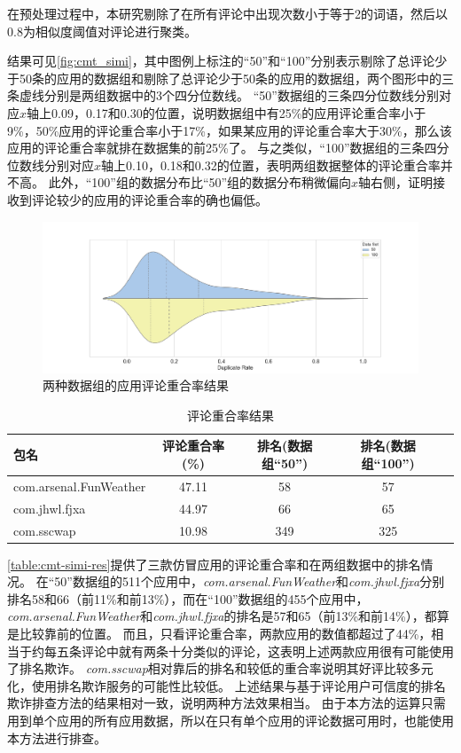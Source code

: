在预处理过程中，本研究剔除了在所有评论中出现次数小于等于2的词语，然后以0.8为相似度阈值对评论进行聚类。

结果可见\autoref{fig:cmt_simi}，其中图例上标注的``50''和``100''分别表示剔除了总评论少于50条的应用的数据组和剔除了总评论少于50条的应用的数据组，两个图形中的三条虚线分别是两组数据中的3个四分位数线。
``50''数据组的三条四分位数线分别对应$x$轴上0.09，0.17和0.30的位置，说明数据组中有25\%的应用评论重合率小于9\%，50\%应用的评论重合率小于17\%，如果某应用的评论重合率大于30\%，那么该应用的评论重合率就排在数据集的前25\%了。
与之类似，``100''数据组的三条四分位数线分别对应$x$轴上0.10，0.18和0.32的位置，表明两组数据整体的评论重合率并不高。
此外，``100''组的数据分布比``50''组的数据分布稍微偏向$x$轴右侧，证明接收到评论较少的应用的评论重合率的确也偏低。

\begin{figure}[htbp]
	\centering
	\includegraphics[width=\textwidth]{./Figures/edwin-cmt-simi-dist.png}
    \caption{两种数据组的应用评论重合率结果}
    \label{fig:cmt_simi}
\end{figure}

\begin{table}[htbp]
	\renewcommand{\arraystretch}{1}
	\small
	\centering
	\caption{评论重合率结果}
	\vspace{1mm}
	\begin{tabular}{lcccc}
		\toprule
		包名 & 评论重合率(\%) & 排名(数据组``50'') & 排名(数据组``100'') \\
		\midrule
		com.arsenal.FunWeather & 47.11 & 58 & 57 \\
		\rowcolor{gray!15} com.jhwl.fjxa & 44.97 & 66 & 65 \\
		com.sscwap & 10.98 & 349 & 325 \\
		\bottomrule
	\end{tabular}
	\label{table:cmt-simi-res}
\end{table}

\autoref{table:cmt-simi-res}提供了三款仿冒应用的评论重合率和在两组数据中的排名情况。
在``50''数据组的511个应用中，\emph{com.arsenal.FunWeather}和\emph{com.jhwl.fjxa}分别排名58和66（前11\%和前13\%），而在``100''数据组的455个应用中，\emph{com.arsenal.FunWeather}和\emph{com.jhwl.fjxa}的排名是57和65（前13\%和前14\%），都算是比较靠前的位置。
而且，只看评论重合率，两款应用的数值都超过了44\%，相当于约每五条评论中就有两条十分类似的评论，这表明上述两款应用很有可能使用了排名欺诈。
\emph{com.sscwap}相对靠后的排名和较低的重合率说明其好评比较多元化，使用排名欺诈服务的可能性比较低。
上述结果与基于评论用户可信度的排名欺诈排查方法的结果相对一致，说明两种方法效果相当。
由于本方法的运算只需用到单个应用的所有应用数据，所以在只有单个应用的评论数据可用时，也能使用本方法进行排查。

